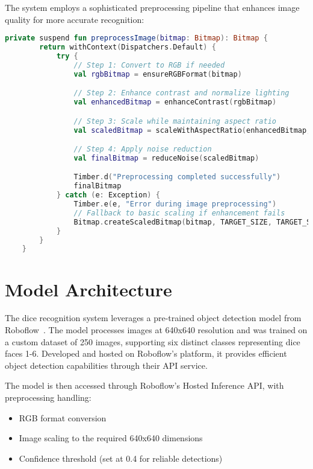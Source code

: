 The system employs a sophisticated preprocessing pipeline that enhances image quality for more accurate recognition:
\begin{lstlisting}[language=Kotlin, caption={Image Preprocessing Pipeline}, label=lst:image_preprocess]
    private suspend fun preprocessImage(bitmap: Bitmap): Bitmap {
        return withContext(Dispatchers.Default) {
            try {
                // Step 1: Convert to RGB if needed
                val rgbBitmap = ensureRGBFormat(bitmap)

                // Step 2: Enhance contrast and normalize lighting
                val enhancedBitmap = enhanceContrast(rgbBitmap)

                // Step 3: Scale while maintaining aspect ratio
                val scaledBitmap = scaleWithAspectRatio(enhancedBitmap, TARGET_SIZE)

                // Step 4: Apply noise reduction
                val finalBitmap = reduceNoise(scaledBitmap)

                Timber.d("Preprocessing completed successfully")
                finalBitmap
            } catch (e: Exception) {
                Timber.e(e, "Error during image preprocessing")
                // Fallback to basic scaling if enhancement fails
                Bitmap.createScaledBitmap(bitmap, TARGET_SIZE, TARGET_SIZE, true)
            }
        }
    }
\end{lstlisting}

\section{Model Architecture}

The dice recognition system leverages a pre-trained object detection model from Roboflow~\cite{bib:kavidataset}. The model processes images at 640x640 resolution and was trained on a custom dataset of 250 images, supporting six distinct classes representing dice faces 1-6. Developed and hosted on Roboflow's platform, it provides efficient object detection capabilities through their API service.

The model is then accessed through Roboflow's Hosted Inference API, with preprocessing handling:
\begin{itemize}
    \item RGB format conversion
    \item Image scaling to the required 640x640 dimensions
    \item Confidence threshold (set at 0.4 for reliable detections)
\end{itemize} 

